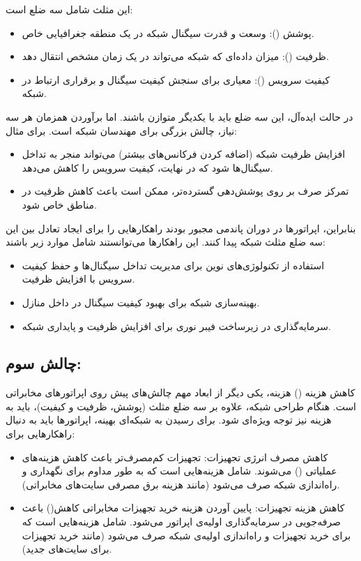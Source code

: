 \documentclass[landscape, 12pt]{report}
\begin{document}
این مثلث شامل سه ضلع است:
\begin{itemize}
\item پوشش (): وسعت و قدرت سیگنال شبکه در یک منطقه جغرافیایی خاص.
\item ظرفیت (): میزان داده‌ای که شبکه می‌تواند در یک زمان مشخص انتقال دهد.
\item کیفیت سرویس (): معیاری برای سنجش کیفیت سیگنال و برقراری ارتباط در شبکه.
\end{itemize}

در حالت ایده‌آل، این سه ضلع باید با یکدیگر متوازن باشند. اما برآوردن همزمان هر سه نیاز، چالش بزرگی برای مهندسان شبکه است. برای مثال:
\begin{itemize}
\item افزایش ظرفیت شبکه (اضافه کردن فرکانس‌های بیشتر) می‌تواند منجر به تداخل سیگنال‌ها شود که در نهایت، کیفیت سرویس را کاهش می‌دهد.
\item تمرکز صرف بر روی پوشش‌دهی گسترده‌تر، ممکن است باعث کاهش ظرفیت در مناطق خاص شود.
\end{itemize}

بنابراین، اپراتورها در دوران پاندمی مجبور بودند راهکارهایی را برای ایجاد تعادل بین این سه ضلع مثلث شبکه پیدا کنند. این راهکارها می‌توانستند شامل موارد زیر باشند:
\begin{itemize}
\item استفاده از تکنولوژی‌های نوین برای مدیریت تداخل سیگنال‌ها و حفظ کیفیت سرویس با افزایش ظرفیت.
\item بهینه‌سازی شبکه برای بهبود کیفیت سیگنال در داخل منازل.
\item سرمایه‌گذاری در زیرساخت فیبر نوری برای افزایش ظرفیت و پایداری شبکه.
\end{itemize}
\subsection*{چالش سوم:}
 کاهش هزینه ()
هزینه، یکی دیگر از ابعاد مهم چالش‌های پیش روی اپراتورهای مخابراتی است. هنگام طراحی شبکه، علاوه بر سه ضلع مثلث (پوشش، ظرفیت و کیفیت)، باید به هزینه نیز توجه ویژه‌ای شود.
برای رسیدن به شبکه‌ای بهینه، اپراتورها باید به دنبال راهکارهایی برای:
\begin{itemize}
\item کاهش مصرف انرژی تجهیزات: تجهیزات کم‌مصرف‌تر باعث کاهش هزینه‌های عملیاتی () می‌شوند.  شامل هزینه‌هایی است که به طور مداوم برای نگهداری و راه‌اندازی شبکه صرف می‌شود (مانند هزینه برق مصرفی سایت‌های مخابراتی).
\item کاهش هزینه تجهیزات: پایین آوردن هزینه خرید تجهیزات مخابراتی کاهش() باعث صرفه‌جویی در سرمایه‌گذاری اولیه‌ی اپراتور می‌شود.  شامل هزینه‌هایی است که برای خرید تجهیزات و راه‌اندازی اولیه‌ی شبکه صرف می‌شود (مانند خرید تجهیزات برای سایت‌های جدید).
\end{itemize}
\end{document}
